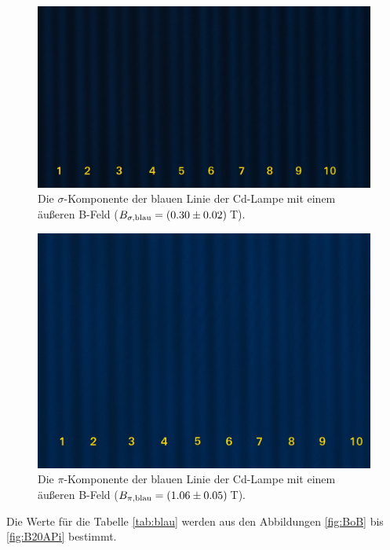 \begin{figure}[H]
  \centering
  \includegraphics[width=0.8\linewidth]{Bilder/B6ASig.JPG}
  \caption{Die $\sigma$-Komponente der blauen Linie der Cd-Lampe mit einem äußeren B-Feld ($B_{\sigma,\text{blau}} = (\num{0.30 +- 0.02})$\,T).}
  \label{fig:B6ASig}
\end{figure}

\begin{figure}[H]
  \centering
  \includegraphics[width=0.8\linewidth]{Bilder/B20APi.JPG}
  \caption{Die $\pi$-Komponente der blauen Linie der Cd-Lampe mit einem äußeren B-Feld ($B_{\pi,\text{blau}} = (\num{1.06 +- 0.05})$\,T).}
  \label{fig:B20APi}
\end{figure}

Die Werte für die Tabelle \eqref{tab:blau} werden aus den Abbildungen \eqref{fig:BoB} bis \eqref{fig:B20APi} bestimmt.

